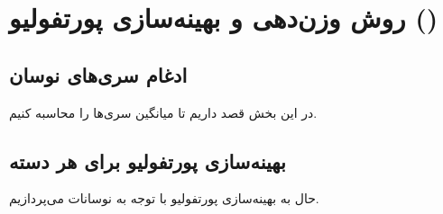 \documentclass[12pt]{article}
\begin{document}
\section{روش وزن‌دهی و بهینه‌سازی پورتفولیو ()}
\subsection{ادغام سری‌های نوسان}
در این بخش قصد داریم تا میانگین سری‌ها را محاسبه کنیم.
\begin{figure}[H]
	\centering
	\quad \quad
\end{figure}
\subsection{بهینه‌سازی پورتفولیو برای هر دسته}
حال به بهینه‌سازی پورتفولیو با توجه به نوسانات می‌پردازیم.
\end{document}
